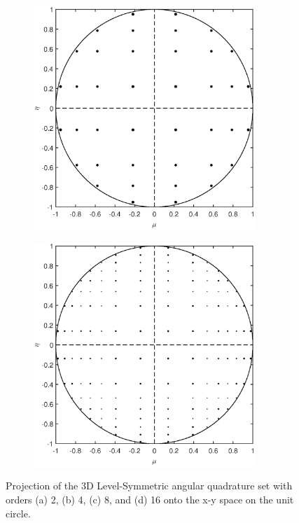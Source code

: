 \begin{figure}
\begin{subfigure}[b]{0.48\textwidth}
		\caption{}
	\end{subfigure}
	\vfill
	\begin{subfigure}[b]{0.48\textwidth}
		\centering
		\includegraphics[width=0.92\textwidth]{figures/sec_Sn/LS8_2D.eps}
		\caption{}
	\end{subfigure}
	\hfill
	\begin{subfigure}[b]{0.48\textwidth}
		\centering
		\includegraphics[width=0.92\textwidth]{figures/sec_Sn/LS16_2D.eps}
		\caption{}
	\end{subfigure}
\caption[2D Level-Symmetric angular quadrature set]{Projection of the 3D Level-Symmetric angular quadrature set with orders (a) 2, (b) 4, (c) 8, and (d) 16 onto the x-y space on the unit circle.}
\label{fig::Sn_Angle_LS_Quads_2D}
\end{figure}

